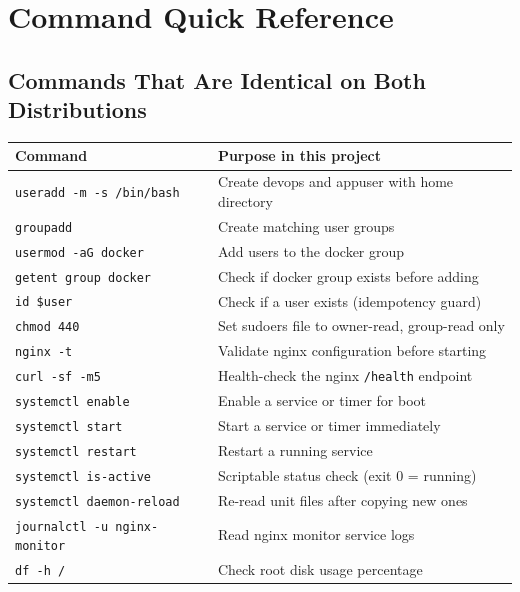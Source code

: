 \documentclass[11pt,a4paper]{article}
\begin{document}
\section{Command Quick Reference}
\label{sec:reference}

\subsection{Commands That Are Identical on Both Distributions}

\begin{center}
\begin{longtable}{L{5cm}L{8.5cm}}
\toprule
\textbf{Command} & \textbf{Purpose in this project} \\
\midrule
\endhead
\texttt{useradd -m -s /bin/bash}     & Create devops and appuser with home directory \\
\texttt{groupadd}                    & Create matching user groups \\
\texttt{usermod -aG docker}          & Add users to the docker group \\
\texttt{getent group docker}         & Check if docker group exists before adding \\
\texttt{id \$user}                   & Check if a user exists (idempotency guard) \\
\texttt{chmod 440}                   & Set sudoers file to owner-read, group-read only \\
\texttt{nginx -t}                    & Validate nginx configuration before starting \\
\texttt{curl -sf -m5}                & Health-check the nginx \texttt{/health} endpoint \\
\texttt{systemctl enable}            & Enable a service or timer for boot \\
\texttt{systemctl start}             & Start a service or timer immediately \\
\texttt{systemctl restart}           & Restart a running service \\
\texttt{systemctl is-active}         & Scriptable status check (exit 0 = running) \\
\texttt{systemctl daemon-reload}     & Re-read unit files after copying new ones \\
\texttt{journalctl -u nginx-monitor} & Read nginx monitor service logs \\
\texttt{df -h /}                     & Check root disk usage percentage \\

\end{longtable}
\end{center}
\end{document}
